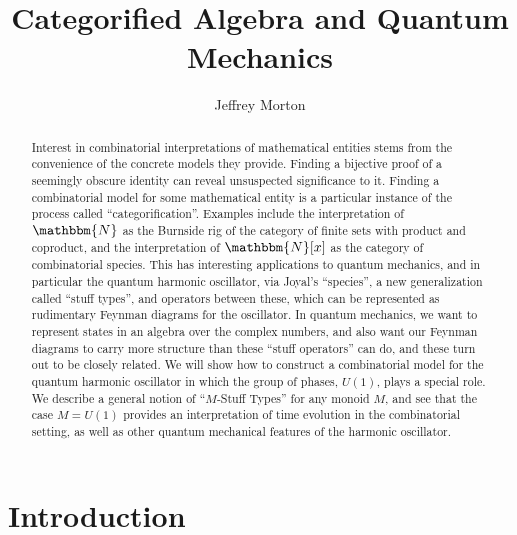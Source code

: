 \documentclass{amsart} \usepackage{amsmath,amssymb,bbm}
\begin{document}
\raggedbottom

\title{Categorified Algebra and Quantum Mechanics} \author{Jeffrey Morton}
\address{University of California, Riverside} 

\begin{abstract}
  Interest in combinatorial interpretations of mathematical entities
  stems from the convenience of the concrete models they
  provide. Finding a bijective proof of a seemingly obscure identity
  can reveal unsuspected significance to it.  Finding a combinatorial
  model for some mathematical entity is a particular instance of the
  process called ``categorification''.  Examples include the
  interpretation of $\mathbbm{N}$ as the Burnside rig of the category
  of finite sets with product and coproduct, and the interpretation of
  $\mathbbm{N} [ x ]$ as the category of combinatorial species.  This
  has interesting applications to quantum mechanics, and in particular
  the quantum harmonic oscillator, via Joyal's ``species'', a new
  generalization called ``stuff types'', and operators between these,
  which can be represented as rudimentary Feynman diagrams for the
  oscillator.  In quantum mechanics, we want to represent states in an
  algebra over the complex numbers, and also want our Feynman diagrams
  to carry more structure than these ``stuff operators'' can do, and
  these turn out to be closely related.  We will show how to construct
  a combinatorial model for the quantum harmonic oscillator in which
  the group of phases, $U(1)$, plays a special role.  We describe a
  general notion of ``$M$-Stuff Types'' for any monoid $M$, and see
  that the case $M=U(1)$ provides an interpretation of time evolution
  in the combinatorial setting, as well as other quantum mechanical
  features of the harmonic oscillator.
\end{abstract}
\maketitle

\pagebreak

\tableofcontents

\pagebreak

\section{Introduction}
\end{document}
